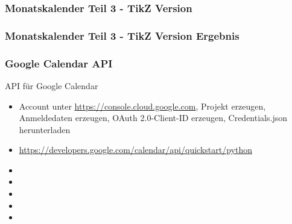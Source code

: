 \documentclass[12pt,ngerman]{beamer}
\begin{document}
\begin{frame}[containsverbatim]
\frametitle{Monatskalender Teil 3 - TikZ Version}


\scalebox{0.96}{%
}


\end{frame}

\begin{frame}[containsverbatim]
\frametitle{Monatskalender Teil 3 - TikZ Version Ergebnis}

\begin{center}
\end{center}

\end{frame}

\begin{frame}
\frametitle{Google Calendar API}

API für Google Calendar

\begin{itemize}
\item Account unter \url{https://console.cloud.google.com}, Projekt erzeugen, Anmeldedaten erzeugen, OAuth 2.0-Client-ID erzeugen, Credentials.json herunterladen
\item \url{https://developers.google.com/calendar/api/quickstart/python}
\item 
\item 
\item 
\item 
\item 
\end{itemize}
\end{frame}
\end{document}

